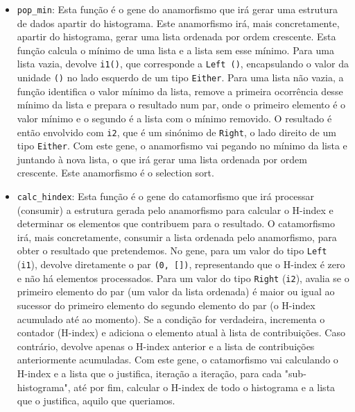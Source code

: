 \documentclass[11pt, a4paper, fleqn]{article}
\begin{document}
\begin{itemize}
    \item \texttt{pop\_min}: Esta função é o gene do anamorfismo que irá gerar uma estrutura de dados apartir do histograma.
    Este anamorfismo irá, mais concretamente, apartir do histograma, gerar uma lista ordenada por ordem crescente.
    Esta função calcula o mínimo de uma lista e a lista sem esse mínimo. Para uma lista vazia, devolve \texttt{i1()}, que corresponde a \texttt{Left ()}, encapsulando o valor da unidade \texttt{()} no lado esquerdo de um tipo \texttt{Either}. Para uma lista não vazia, a função identifica o valor mínimo da lista, remove a primeira ocorrência desse mínimo da lista e prepara o resultado num par, onde o primeiro elemento é o valor mínimo e o segundo é a lista com o mínimo removido. O resultado é então envolvido com \texttt{i2}, que é um sinónimo de \texttt{Right}, o lado direito de um tipo \texttt{Either}. 
    Com este gene, o anamorfismo vai pegando no mínimo da lista e juntando à nova lista, o que irá gerar uma lista ordenada por ordem crescente. Este anamorfismo é o selection sort.
    \item \texttt{calc\_hindex}: Esta função é o gene do catamorfismo que irá processar (consumir) a estrutura gerada pelo anamorfismo para calcular o H-index e determinar os elementos que contribuem para o resultado. O catamorfismo irá, mais concretamente, consumir a lista ordenada pelo anamorfismo, para obter o resultado que pretendemos. No gene, para um valor do tipo \texttt{Left} (\texttt{i1}), devolve diretamente o par \texttt{(0, [])}, representando que o H-index é zero e não há elementos processados. Para um valor do tipo \texttt{Right} (\texttt{i2}), avalia se o primeiro elemento do par (um valor da lista ordenada) é maior ou igual ao sucessor do primeiro elemento do segundo elemento do par (o H-index acumulado até ao momento). Se a condição for verdadeira, incrementa o contador (H-index) e adiciona o elemento atual à lista de contribuições. Caso contrário, devolve apenas o H-index anterior e a lista de contribuições anteriormente acumuladas.
    Com este gene, o catamorfismo vai calculando o H-index e a lista que o justifica, iteração a iteração, para cada "sub-histograma", até por fim, calcular o H-index de todo o histograma e a lista que o justifica, aquilo que queriamos.
\end{itemize}
\end{document}

